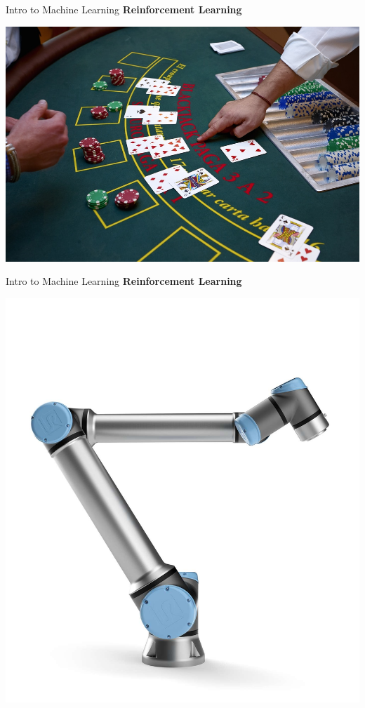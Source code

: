 \documentclass{beamer}
\begin{document}
\begin{frame}[fragile]{Intro to Machine Learning}
    \textbf{Reinforcement Learning}
    \begin{center}
        \includegraphics[width=\textwidth,height=0.7\textheight,keepaspectratio]{figures/Blackjack.jpg}
    \end{center}
\end{frame}
\begin{frame}[fragile]{Intro to Machine Learning}
    \textbf{Reinforcement Learning}
    \begin{center}
        \includegraphics[width=\textwidth,height=0.7\textheight,keepaspectratio]{figures/UR10e.jpg}
    \end{center}
\end{frame}
\end{document}
